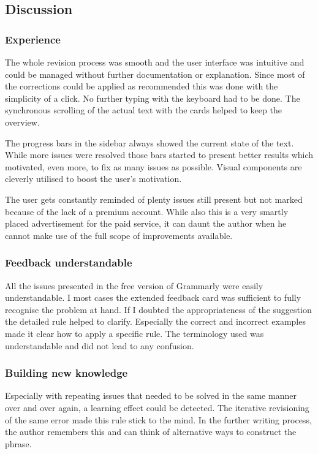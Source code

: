 \documentclass[runningheads]{llncs}
\let\OldTextregistered\textregistered
\renewcommand{\textregistered}{\OldTextregistered\xspace}
\begin{document}
\subsection{Discussion}
\subsubsection{Experience}
The whole revision process was smooth and the user interface was intuitive and could be managed without further documentation or explanation. Since most of the corrections could be applied as recommended this was done with the simplicity of a click. No further typing with the keyboard had to be done. The synchronous scrolling of the actual text with the cards helped to keep the overview.

The progress bars in the sidebar always showed the current state of the text. While more issues were resolved those bars started to present better results which motivated, even more, to fix as many issues as possible. Visual components are cleverly utilised to boost the user's motivation.

The user gets constantly reminded of plenty issues still present but not marked because of the lack of a premium account. While also this is a very smartly placed advertisement for the paid service, it can daunt the author when he cannot make use of the full scope of improvements available.

\subsubsection{Feedback understandable}
All the issues presented in the free version of Grammarly\textregistered were easily understandable. I most cases the extended feedback card was sufficient to fully recognise the problem at hand. If I doubted the appropriateness of the suggestion the detailed rule helped to clarify. Especially the correct and incorrect examples made it clear how to apply a specific rule. The terminology used was understandable and did not lead to any confusion.

\subsubsection{Building new knowledge}
Especially with repeating issues that needed to be solved in the same manner over and over again, a learning effect could be detected. The iterative revisioning of the same error made this rule stick to the mind. In the further writing process, the author remembers this and can think of alternative ways to construct the phrase.
\end{document}
